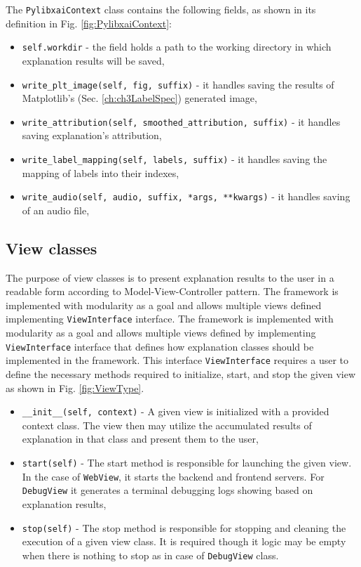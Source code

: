 \documentclass[
    bindingoffset=5mm,  %
    footnoteindent=3mm, %
    hyphenation=true    %
]{src/wut-thesis}
\begin{document}
The \texttt{PylibxaiContext} class contains the following fields, as shown in its definition in Fig. \ref{fig:PylibxaiContext}:

\begin{itemize}
    \item \texttt{self.workdir} - the field holds a path to the working directory in which explanation results will be saved,
    \item \texttt{write_plt_image(self, fig, suffix)} - it handles saving the results of Matplotlib's (Sec. \ref{ch:ch3LabelSpec}) generated image,
    \item \texttt{write_attribution(self, smoothed_attribution, suffix)} - it handles saving explanation's attribution,
    \item \texttt{write_label_mapping(self, labels, suffix)} - it handles saving the mapping of labels into their indexes,
    \item \texttt{write_audio(self, audio, suffix, *args, **kwargs)} - it handles saving of an audio file,
\end{itemize}

\subsection{View classes}

The purpose of view classes is to present explanation results to the user in a readable form
according to Model-View-Controller pattern. The framework is implemented with modularity as a goal
and allows multiple views defined implementing \texttt{ViewInterface} interface.
The framework is implemented with modularity as a goal and allows multiple views
defined by implementing \texttt{ViewInterface} interface that defines how explanation
classes should be implemented in the framework.
This interface \texttt{ViewInterface} requires a user to define the necessary
methods required to initialize, start, and stop the given view as shown in Fig. \ref{fig:ViewType}.

\begin{itemize}
    \item \texttt{__init__(self, context)} - A given view is initialized with a provided context class.
    The view then may utilize the accumulated results of explanation in that class and present them to the user,

    \item \texttt{start(self)} - The start method is responsible for launching the given view. In the case of \texttt{WebView},
    it starts the backend and frontend servers. For \texttt{DebugView} it generates a terminal debugging logs showing based on 
    explanation results,
    
    \item \texttt{stop(self)} - The stop method is responsible for stopping and cleaning the execution of a given view class. It is required though it logic may be empty when there is nothing to stop as in case of \texttt{DebugView} class.
\end{itemize}
\end{document}
